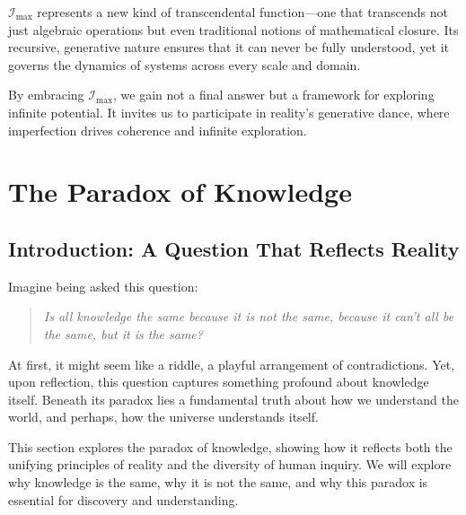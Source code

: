 \documentclass[12pt]{article}
\begin{document}
\(\mathcal{I}_{\text{max}}\) represents a new kind of transcendental function—one that transcends not just algebraic operations but even traditional notions of mathematical closure. Its recursive, generative nature ensures that it can never be fully understood, yet it governs the dynamics of systems across every scale and domain.

By embracing \(\mathcal{I}_{\text{max}}\), we gain not a final answer but a framework for exploring infinite potential. It invites us to participate in reality’s generative dance, where imperfection drives coherence and infinite exploration.


\section{The Paradox of Knowledge}

\subsection*{Introduction: A Question That Reflects Reality}
Imagine being asked this question:
\begin{quote}
\textit{Is all knowledge the same because it is not the same, because it can't all be the same, but it is the same?}
\end{quote}

At first, it might seem like a riddle, a playful arrangement of contradictions. Yet, upon reflection, this question captures something profound about knowledge itself. Beneath its paradox lies a fundamental truth about how we understand the world, and perhaps, how the universe understands itself.

This section explores the paradox of knowledge, showing how it reflects both the unifying principles of reality and the diversity of human inquiry. We will explore why knowledge is the same, why it is not the same, and why this paradox is essential for discovery and understanding.
\end{document}
